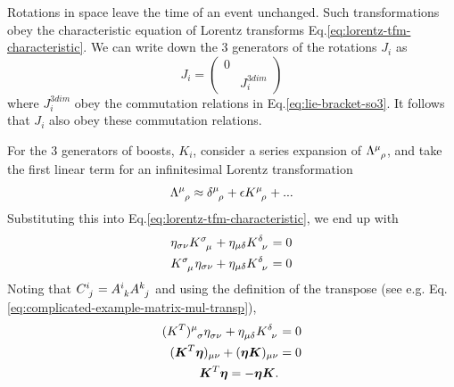 \documentclass[11pt]{article}
\numberwithin{equation}{section}
\begin{document}
Rotations in space leave the time of an event unchanged. Such transformations obey the characteristic equation of Lorentz transforms Eq.\eqref{eq:lorentz-tfm-characteristic}. We can write down the 3 generators of the rotations $J_i$ as
\begin{equation}
J_i =  \begin{pmatrix}
0&\\
&J_i^{3dim}
\end{pmatrix} \label{eq:representation-rotation-lorentz}
\end{equation}
where $J_i^{3dim}$ obey the commutation relations in Eq.\eqref{eq:lie-bracket-so3}. It follows that $J_i$ also obey these commutation relations.

For the 3 generators of boosts, $K_i$, consider a series expansion of $\tensor{\Lambda}{^\mu_\rho}$, and take the first linear term for an infinitesimal Lorentz transformation 
\begin{equation}
\tensor{\Lambda}{^\mu_\rho} \approx \tensor{\delta}{^\mu _\rho} + \epsilon \tensor{K}{^\mu _\rho} + ...
\end{equation}
Substituting this into Eq.\eqref{eq:lorentz-tfm-characteristic}, we end up with
\begin{align}
\eta_{\sigma \nu} \tensor{K}{^\sigma _\mu} + \eta_{\mu \delta} \tensor{K}{^\delta _\nu}   &= 0 \\
\tensor{K}{^\sigma _\mu} \eta_{\sigma \nu} + \eta_{\mu \delta} \tensor{K}{^\delta _\nu}   &= 0
\end{align}
Noting that $\tensor{C}{^i_j} = \tensor{A}{^i_k}\tensor{A}{^k_j}$ and using the definition of the transpose (see e.g. Eq.\eqref{eq:complicated-example-matrix-mul-transp}),
\begin{align}
\tensor{(\protect{K^T})}{^\mu _\sigma} \tensor{\eta}{_\sigma _\nu} + \tensor{\eta}{_\mu_\delta} \tensor{K}{^\delta _\nu}   &= 0 \\
(\boldsymbol{K}^T\boldsymbol{\eta})_{\mu \nu} + (\boldsymbol{\eta K})_{\mu \nu}   &= 0 \\
\boldsymbol{K}^T\boldsymbol{\eta} = - \boldsymbol{\eta K}. \label{eq:condition-generators-lt}
\end{align}
\end{document}
